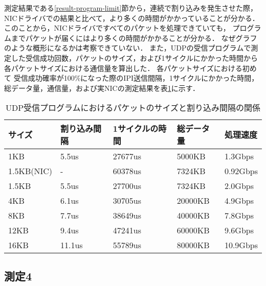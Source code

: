 \documentclass[12pt]{jsarticle}
\begin{document}
測定結果である\ref{result-program-limit}節から，連続で割り込みを発生させた際，
NICドライバでの結果と比べて，より多くの時間がかかっていることが分かる．
このことから，NICドライバですべてのパケットを処理できていても，
プログラムまでパケットが届くにはより多くの時間がかかることが分かる．
なぜグラフのような概形になるかは考察できていない．
また，UDPの受信プログラムで測定した受信成功回数，パケットのサイズ，および1サイクルにかかった時間から
各パケットサイズにおける通信量を算出した．
各パケットサイズにおける初めて
受信成功確率が100\%になった際のIPI送信間隔，1サイクルにかかった時間，
総データ量，通信量，および実NICの測定結果を表\ref{table:program}に示す．

\begin{table}[h]
    \caption{UDP受信プログラムにおけるパケットのサイズと割り込み間隔の関係}
    \label{table:program}
    \begin{center}
        \begin{tabular}{l|l|l|l|l}   \hline \hline 
            サイズ   & 割り込み間隔      & 1サイクルの時間      & 総データ量   & 処理速度       \\ \hline
            1KB      & 5.5us            & 27677us              & 5000KB       & 1.3Gbps            \\ 
            1.5KB(NIC)& -               & 60378us              & 7324KB       & 0.92Gbps           \\
            1.5KB    & 5.5us            & 27700us              & 7324KB       & 2.0Gbps            \\ 
            4KB      & 6.1us            & 30705us              & 20000KB      & 4.9Gbps            \\ 
            8KB      & 7.7us            & 38649us              & 40000KB      & 7.8Gbps            \\ 
            12KB     & 9.4us            & 47241us              & 60000KB      & 9.6Gbps            \\ 
            16KB     & 11.1us           & 55789us              & 80000KB      & 10.9Gbps           \\ \hline
        \end{tabular}
    \end{center}
\end{table}

\subsection{測定4}
\end{document}
